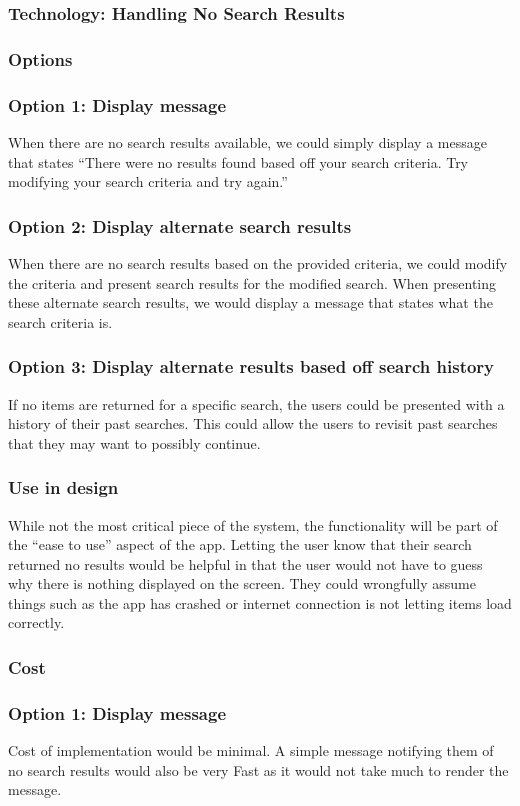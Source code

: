 \documentclass[journal,compsoc, 10pt, draftclsnofoot, onecolumn]{IEEEtran}
\begin{document}
\subsubsection{Technology: Handling No Search Results}
\subsubsection*{Options}

\subsubsection*{Option 1: Display message}
When there are no search results available, we could simply display a message 
that states ``There were no results found based off your search criteria. Try 
modifying your search criteria and try again.''
\subsubsection*{Option 2: Display alternate search results}
When there are no search results based on the provided criteria, we could 
modify the criteria and present search results for the modified search. When 
presenting these alternate search results, we would display a message that 
states what the search criteria is.
\subsubsection*{Option 3: Display alternate results based off search history}
If no items are returned for a specific search, the users could be presented 
with a history of their past searches. This could allow the users to revisit 
past searches that they may want to possibly continue.
\subsubsection*{Use in design}
While not the most critical piece of the system, the functionality will be part 
of the ``ease to use'' aspect of the app. Letting the user know that their 
search returned no results would be helpful in that the user would not have to 
guess why there is nothing displayed on the screen. They could wrongfully 
assume things such as the app has crashed or internet connection is not 
letting items load correctly.
\subsubsection*{Cost}
\subsubsection*{Option 1: Display message}
Cost of implementation would be minimal. A simple message notifying them of no 
search results would also be very Fast as it would not take much to render the 
message. 
\end{document}
